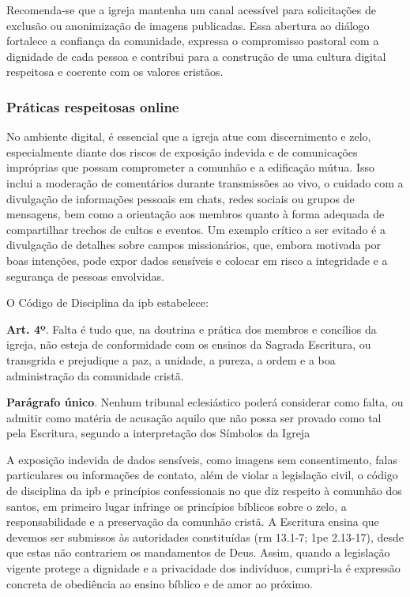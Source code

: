 Recomenda-se que a igreja mantenha um canal acessível para solicitações de exclusão ou anonimização de imagens publicadas. Essa abertura ao diálogo fortalece a confiança da comunidade, expressa o compromisso pastoral com a dignidade de cada pessoa e contribui para a construção de uma cultura digital respeitosa e coerente com os valores cristãos.

\subsubsection{Práticas respeitosas online}

No ambiente digital, é essencial que a igreja atue com discernimento e zelo, especialmente diante dos riscos de exposição indevida e de comunicações impróprias que possam comprometer a comunhão e a edificação mútua. Isso inclui a moderação de comentários durante transmissões ao vivo, o cuidado com a divulgação de informações pessoais em chats, redes sociais ou grupos de mensagens, bem como a orientação aos membros quanto à forma adequada de compartilhar trechos de cultos e eventos. Um exemplo crítico a ser evitado é a divulgação de detalhes sobre campos missionários, que, embora motivada por boas intenções, pode expor dados sensíveis e colocar em risco a integridade e a segurança de pessoas envolvidas.

O Código de Disciplina da \gls{ipb} estabelece:

\begin{citacao}
\textbf{Art. 4º}. Falta é tudo que, na doutrina e prática dos membros e concílios da igreja, não esteja de conformidade com os ensinos da Sagrada Escritura, ou transgrida e prejudique a paz, a unidade, a pureza, a ordem e a boa administração da comunidade cristã.

\textbf{Parágrafo único}. Nenhum tribunal eclesiástico poderá considerar como falta, ou admitir como matéria de acusação aquilo que não possa ser provado como tal pela Escritura, segundo a interpretação dos Símbolos da Igreja \cite[art.~4]{ipb_codigodisciplina}
\end{citacao} 

A exposição indevida de dados sensíveis, como imagens sem consentimento, falas particulares ou informações de contato, além de violar a legislação civil, o código de disciplina da \gls{ipb} e princípios confessionais no que diz respeito à comunhão dos santos, em primeiro lugar infringe os princípios bíblicos sobre o zelo, a responsabilidade e a preservação da comunhão cristã. A Escritura ensina que devemos ser submissos às autoridades constituídas (\gls{rm} 13.1-7; \gls{1pe} 2.13-17), desde que estas não contrariem os mandamentos de Deus. Assim, quando a legislação vigente protege a dignidade e a privacidade dos indivíduos, cumpri-la é expressão concreta de obediência ao ensino bíblico e de amor ao próximo.

